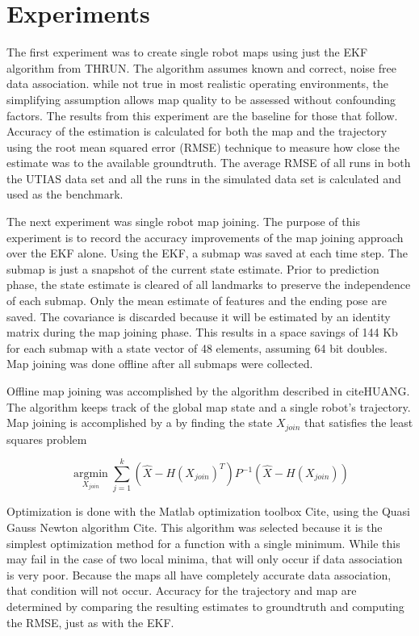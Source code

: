 \documentclass[12pt]{report}
\begin{document}
\section{Experiments}
The first experiment was to create single robot maps using just the EKF algorithm from THRUN.  The algorithm assumes known and correct, noise free data association.  while not true in most realistic operating environments, the simplifying assumption allows map quality to be assessed without confounding factors.  The results from this experiment are the baseline for those that follow. Accuracy of the estimation is calculated for both the map and the trajectory using the root mean squared error (RMSE) technique to measure how close the estimate was to the available groundtruth.  The average RMSE of all runs in both the UTIAS data set and all the runs in the simulated data set is calculated and used as the benchmark.  

The next experiment was single robot map joining.  The purpose of this experiment is to record the accuracy improvements of the map joining approach over the EKF alone.  Using the EKF, a submap was saved at each time step.  The submap is just a snapshot of the current state estimate.  Prior to prediction phase, the state estimate is cleared of all landmarks to preserve the independence of each submap.  Only the mean estimate of features and the ending pose are saved.  The covariance is discarded because it will be estimated by an identity matrix during the map joining phase.  This results in a space savings of 144 Kb for each submap with a state vector of 48 elements, assuming 64 bit doubles.  Map joining was done offline after all submaps were collected. 

Offline map joining was accomplished by the algorithm described in cite{HUANG}.  The algorithm keeps track of the global map state and a single robot's trajectory.  Map joining is accomplished by a by finding the state $X_{join}$ that satisfies the least squares problem 

\begin{equation}
\underset{X_{join}}{\operatorname{argmin}}  \sum \limits_{j=1}^k (\hat{X} - H(X_{join})^T) P^{-1} (\hat{X} - H(X_{join}))
\end{equation}

Optimization is done with the Matlab optimization toolbox {Cite}, using the Quasi Gauss Newton algorithm {Cite}.  This algorithm was selected because it is the simplest optimization method for a function with a single minimum.  While this may fail in the case of two local minima, that will only occur if data association is very poor.  Because the maps all have completely accurate data association, that condition will not occur.  Accuracy for the trajectory and map are determined by comparing the resulting estimates to groundtruth and computing the RMSE, just as with the EKF.
\end{document}
